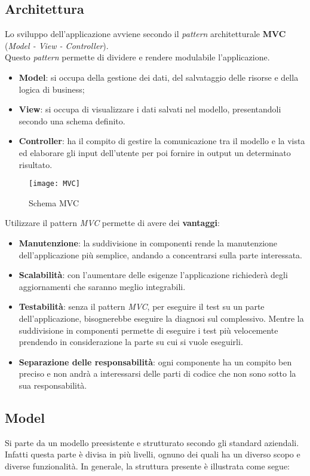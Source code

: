 \newpage
\subsection{Architettura}
Lo sviluppo dell'applicazione avviene secondo il \textit{pattern} architetturale \textbf{MVC \glsfirstoccur} (\textit{Model - View - Controller}). \\
Questo \textit{pattern} permette di dividere e rendere modulabile l'applicazione.
\begin{itemize}
\item \textbf{Model}: si occupa della gestione dei dati, del salvataggio delle risorse e della logica di business;
\item \textbf{View}: si occupa di visualizzare i dati salvati nel modello, presentandoli secondo una schema definito.
\item \textbf{Controller}: ha il compito di gestire la comunicazione tra il modello e la vista ed elaborare gli input dell'utente per poi fornire in output un determinato risultato.
\end{itemize}

\begin{figure}[H]
    \centering 
    \texttt{[image: MVC]} 
    \bigskip
    \caption{Schema MVC}
\end{figure}

\noindent
Utilizzare il pattern \textit{MVC} permette di avere dei \textbf{vantaggi}:
\begin{itemize}
\item \textbf{Manutenzione}: la suddivisione in componenti rende la manutenzione dell'applicazione più semplice, andando a concentrarsi sulla parte interessata.  
\item \textbf{Scalabilità}: con l'aumentare delle esigenze l'applicazione richiederà degli aggiornamenti che saranno meglio integrabili.
\item \textbf{Testabilità}: senza il pattern \textit{MVC}, per eseguire il test su un parte dell'applicazione, bisognerebbe eseguire la diagnosi sul complessivo. Mentre la suddivisione in componenti permette di eseguire i test più velocemente prendendo in considerazione la parte su cui si vuole eseguirli.
\item \textbf{Separazione delle responsabilità}: ogni componente ha un compito ben preciso e non andrà a interessarsi delle parti di codice che non sono sotto la sua responsabilità.
\end{itemize}

\subsection*{Model}
Si parte da un modello preesistente e strutturato secondo gli standard aziendali. Infatti questa parte è divisa in più livelli, ognuno dei quali ha un diverso scopo e diverse funzionalità. In generale, la struttura presente è illustrata come segue: 

